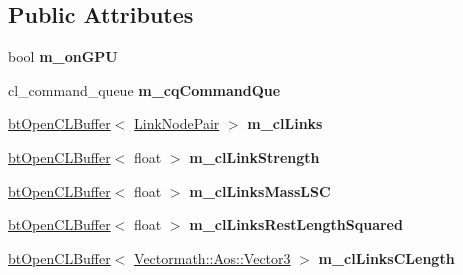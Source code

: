 \subsection*{Public Attributes}
\begin{DoxyCompactItemize}
\item 
\mbox{\label{classbtSoftBodyLinkDataOpenCL_aece77286bec72c11551481d76fb472fa}} 
bool {\bfseries m\+\_\+on\+G\+PU}
\item 
\mbox{\label{classbtSoftBodyLinkDataOpenCL_a6fef03532cdabfe84bbb948d7ab13a9f}} 
cl\+\_\+command\+\_\+queue {\bfseries m\+\_\+cq\+Command\+Que}
\item 
\mbox{\label{classbtSoftBodyLinkDataOpenCL_ad139a9e3911dc802d499c23b51e17181}} 
\hyperlink{classbtOpenCLBuffer}{bt\+Open\+C\+L\+Buffer}$<$ \hyperlink{classbtSoftBodyLinkData_1_1LinkNodePair}{Link\+Node\+Pair} $>$ {\bfseries m\+\_\+cl\+Links}
\item 
\mbox{\label{classbtSoftBodyLinkDataOpenCL_a674450721af3c186aa6f1add42a5aca9}} 
\hyperlink{classbtOpenCLBuffer}{bt\+Open\+C\+L\+Buffer}$<$ float $>$ {\bfseries m\+\_\+cl\+Link\+Strength}
\item 
\mbox{\label{classbtSoftBodyLinkDataOpenCL_aa3c5c4b9fd07e913adfa9823f8441a52}} 
\hyperlink{classbtOpenCLBuffer}{bt\+Open\+C\+L\+Buffer}$<$ float $>$ {\bfseries m\+\_\+cl\+Links\+Mass\+L\+SC}
\item 
\mbox{\label{classbtSoftBodyLinkDataOpenCL_acab30104b4ab70446bdc507d9ab19f8f}} 
\hyperlink{classbtOpenCLBuffer}{bt\+Open\+C\+L\+Buffer}$<$ float $>$ {\bfseries m\+\_\+cl\+Links\+Rest\+Length\+Squared}
\item 
\mbox{\label{classbtSoftBodyLinkDataOpenCL_a188cad13a39e3d59e627410e5060b32b}} 
\hyperlink{classbtOpenCLBuffer}{bt\+Open\+C\+L\+Buffer}$<$ \hyperlink{classVectormath_1_1Aos_1_1Vector3}{Vectormath\+::\+Aos\+::\+Vector3} $>$ {\bfseries m\+\_\+cl\+Links\+C\+Length}
\item 
\mbox{\label{classbtSoftBodyLinkDataOpenCL_adbf94fc007a1d5ebbd873b4065875186}} 

\end{DoxyCompactItemize}
